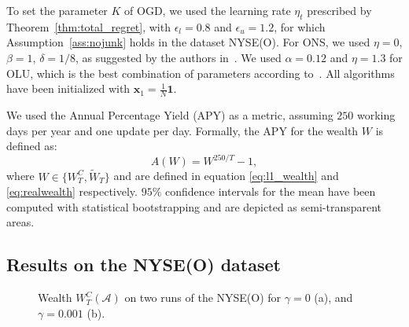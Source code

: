To set the parameter $K$ of OGD, we used the learning rate $\eta_t$ prescribed by Theorem~\ref{thm:total_regret}, with $\epsilon_l = 0.8$ and $\epsilon_u = 1.2$, for which Assumption~\ref{ass:nojunk} holds in the dataset NYSE(O).
For ONS, we used $\eta = 0$, $\beta = 1$, $\delta = 1/8$, as suggested by the authors in~\cite{agarwal2006algorithms}.
We used $\alpha = 0.12$ and $\eta = 1.3$ for OLU, which is the best combination of parameters according to~\cite{das2013online}.
All algorithms have been initialized with $\mathbf{x}_1 = \frac{1}{N} \mathbf{1}$.

We used the Annual Percentage Yield (APY) as a metric, assuming $250$ working days per year and one update per day.
Formally, the APY for the wealth $W$ is defined as:
\begin{equation*}
    A(W) = W^{250/T} - 1,
\end{equation*}
where $W \in \{ W_T^C, \tilde W_T \}$ and are defined in equation \eqref{eq:l1_wealth} and \eqref{eq:realwealth} respectively.
$95\%$ confidence intervals for the mean have been computed with statistical bootstrapping and are depicted as semi-transparent areas.

\subsection{Results on the NYSE(O) dataset}

\begin{figure}[t!]
    \centering
\caption{Wealth $W_T^C(\mathcal{A})$ on two runs of the NYSE(O) for $\gamma = 0$ (a), and $\gamma = 0.001$ (b).} \label{fig:algo_copmarison}
\end{figure}


